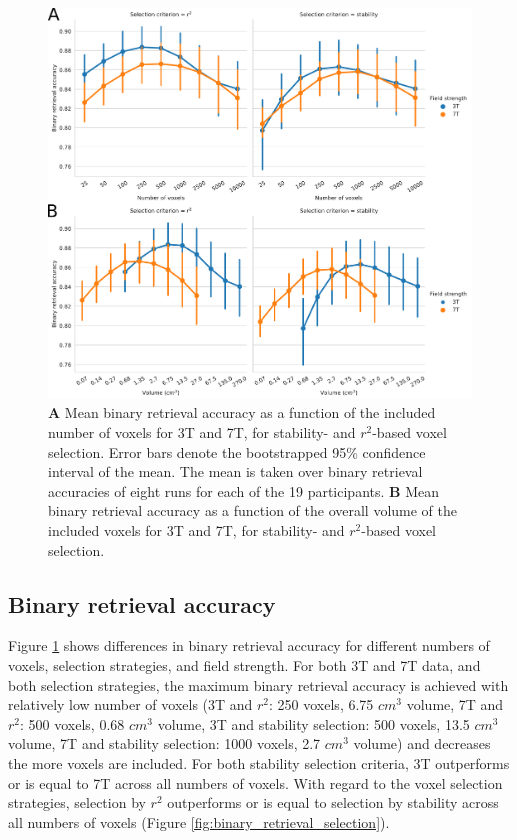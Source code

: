 \begin{figure}
  \centering
  \includegraphics[width=\linewidth]{pics/binary.pdf}
	
  \caption{\textbf{A} Mean binary retrieval accuracy as a function of the
  included number of voxels for 3T and 7T, for stability- and $r^2$-based
  voxel selection. Error bars denote the bootstrapped 95\% confidence interval
  of the mean. The mean is taken over binary retrieval accuracies of eight runs
  for each of the 19 participants. \textbf{B} Mean binary retrieval accuracy as
a function of the overall volume of the included voxels for 3T and 7T, for
stability- and $r^2$-based voxel selection.
}

 \label{fig:binary_retrieval}\end{figure}

\subsection*{Binary retrieval accuracy}

Figure \ref{fig:binary_retrieval} shows differences in binary retrieval accuracy for different numbers of voxels, selection strategies, and field strength.
For both 3T and 7T data, and both selection strategies, the maximum binary retrieval accuracy is achieved with relatively low number of voxels (3T and $r^{2}$: 250 voxels, 6.75 $cm^{3}$ volume, 7T and $r^{2}$: 500 voxels, 0.68 $cm^{3}$ volume, 3T and stability selection: 500 voxels, 13.5 $cm^{3}$ volume, 7T and stability selection: 1000 voxels, 2.7 $cm^{3}$ volume) and decreases the more voxels are included. For both stability selection criteria, 3T outperforms or is equal to 7T across all numbers of voxels. With regard to the voxel selection strategies, selection by $r^{2}$ outperforms or is equal to selection by stability across all numbers of voxels (Figure \ref{fig:binary_retrieval_selection}).

